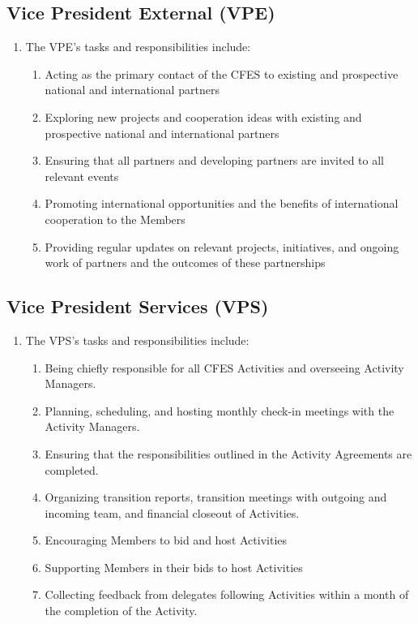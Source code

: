 \subsection{Vice President External (VPE)}
\label{national-executive-vice-president-external-vpe}

\begin{enumerate}
 \item The VPE’s tasks and responsibilities include:
  \begin{enumerate}
   \item Acting as the primary contact of the CFES to existing and prospective national and international partners
   \item Exploring new projects and cooperation ideas with existing and prospective national and international partners
   \item Ensuring that all partners and developing partners are invited to all relevant events
   \item Promoting international opportunities and the benefits of international cooperation to the Members
   \item Providing regular updates on relevant projects, initiatives, and ongoing work of partners and the outcomes of these partnerships
  \end{enumerate}
\end{enumerate}

\subsection{Vice President Services (VPS)}
\label{national-executive-vice-president-services-vps}

\begin{enumerate}
 \item The VPS’s tasks and responsibilities include:
  \begin{enumerate}
   \item Being chiefly responsible for all CFES Activities and overseeing Activity Managers.
   \item Planning, scheduling, and hosting monthly check-in meetings with the Activity Managers.
   \item Ensuring that the responsibilities outlined in the Activity Agreements are completed.
   \item Organizing transition reports, transition meetings with outgoing and incoming team, and financial closeout of Activities.
   \item Encouraging Members to bid and host Activities
   \item Supporting Members in their bids to host Activities
   \item Collecting feedback from delegates following Activities within a month of the completion of the Activity.
  \end{enumerate}
\end{enumerate}

